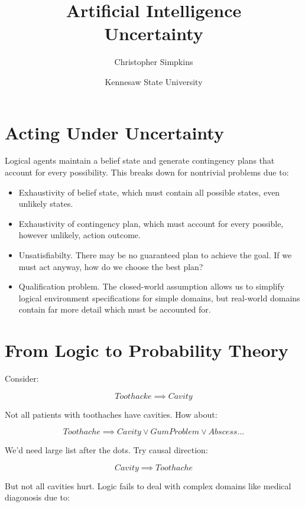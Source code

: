 \documentclass[11pt]{article}
\author{Christopher Simpkins}
\date{Kennesaw State University}
\title{Artificial Intelligence\\\medskip
\large Uncertainty}
\begin{document}
\maketitle
\section{Acting Under Uncertainty}
\label{sec:org946b855}

Logical agents maintain a belief state and generate contingency plans that account for every possibility.  This breaks down for nontrivial problems due to:

\begin{itemize}
\item Exhaustivity of belief state, which must contain all possible states, even unlikely states.
\item Exhaustivity of contingency plan, which must account for every possible, however unlikely, action outcome.
\item Unsatisfiabilty.  There may be no guaranteed plan to achieve the goal.  If we must act anyway, how do we choose the best plan?
\item Qualification problem.  The closed-world assumption allows us to simplify logical environment specifications for simple domains, but real-world domains contain far more detail which must be accounted for.
\end{itemize}
\section{From Logic to Probability Theory}
\label{sec:org46b4553}

Consider:

\begin{equation*}
Toothacke \implies Cavity
\end{equation*}

Not all patients with toothaches have cavities.  How about:

\begin{equation*}
Toothache \implies Cavity \lor GumProblem \lor Abscess \dots
\end{equation*}

We'd need large list after the dots.  Try causal direction:

\begin{equation*}
Cavity \implies Toothache
\end{equation*}

But not all cavities hurt.  Logic fails to deal with complex domains like medical diagonosis due to:
\end{document}
